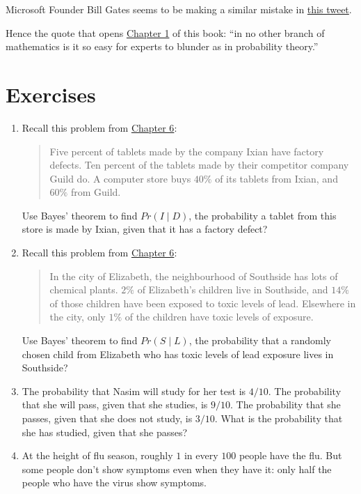 \documentclass[justified]{tufte-book}
\newcommand{\given}{\mid}
\newcommand{\p}{Pr}
\theoremstyle{definition}
\theoremstyle{definition}
\theoremstyle{definition}
\theoremstyle{remark}
\begin{document}
\begin{marginfigure}
Microsoft Founder Bill Gates seems to be making a similar mistake in
\href{https://twitter.com/BillGates/status/1118196606975787008}{this
tweet}.
\end{marginfigure}

Hence the quote that opens \protect\hyperlink{the-monty-hall-problem}{Chapter 1} of this book: ``in no other branch of mathematics is it so easy for experts to blunder as in probability theory.''

\hypertarget{exercises-6}{%
\section*{Exercises}\label{exercises-6}}

\begin{enumerate}
\item
  Recall this problem from \protect\hyperlink{ch6ex}{Chapter 6}:

  \begin{quote}
  Five percent of tablets made by the company Ixian have factory defects. Ten percent of the tablets made by their competitor company Guild do. A computer store buys \(40\%\) of its tablets from Ixian, and \(60\%\) from Guild.
  \end{quote}

  Use Bayes' theorem to find \(\p(I \given D)\), the probability a tablet from this store is made by Ixian, given that it has a factory defect?
\item
  Recall this problem from \protect\hyperlink{ch6ex}{Chapter 6}:

  \begin{quote}
  In the city of Elizabeth, the neighbourhood of Southside has lots of chemical plants. \(2\%\) of Elizabeth's children live in Southside, and \(14\%\) of those children have been exposed to toxic levels of lead. Elsewhere in the city, only \(1\%\) of the children have toxic levels of exposure.
  \end{quote}

  Use Bayes' theorem to find \(\p(S \given L)\), the probability that a randomly chosen child from Elizabeth who has toxic levels of lead exposure lives in Southside?
\item
  The probability that Nasim will study for her test is \(4/10\). The probability that she will pass, given that she studies, is \(9/10\). The probability that she passes, given that she does not study, is \(3/10\). What is the probability that she has studied, given that she passes?
\item
  At the height of flu season, roughly \(1\) in every \(100\) people have the flu. But some people don't show symptoms even when they have it: only half the people who have the virus show symptoms.


\end{enumerate}
\end{document}
